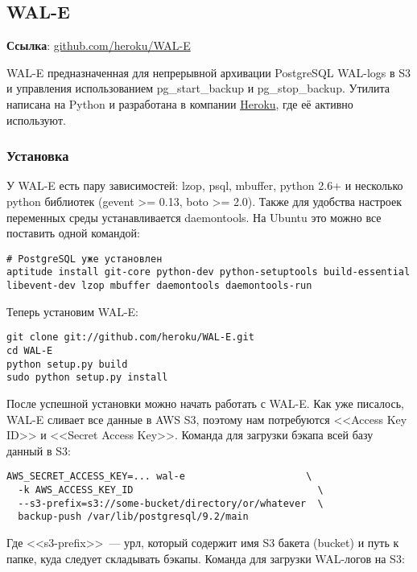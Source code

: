 \subsection{WAL-E}
\textbf{Ссылка}: \href{https://github.com/heroku/WAL-E}{github.com/heroku/WAL-E}

WAL-E предназначенная для непрерывной архивации PostgreSQL WAL-logs в S3 и управления использованием pg\_start\_backup и pg\_stop\_backup. Утилита написана на Python и разработана в компании \href{http://www.heroku.com/}{Heroku}, где её активно используют. 

\subsubsection{Установка}

У WAL-E есть пару зависимостей: lzop, psql, mbuffer, python 2.6+ и несколько python библиотек (gevent >= 0.13, boto >= 2.0). Также для удобства настроек переменных среды устанавливается daemontools. На Ubuntu это можно все поставить одной командой:

\begin{lstlisting}[label=lst:wal-e1,caption=Установка зависимостей для WAL-E]
# PostgreSQL уже установлен
aptitude install git-core python-dev python-setuptools build-essential libevent-dev lzop mbuffer daemontools daemontools-run
\end{lstlisting}

Теперь установим WAL-E:

\begin{lstlisting}[label=lst:wal-e2,caption=Установка WAL-E]
git clone git://github.com/heroku/WAL-E.git
cd WAL-E
python setup.py build
sudo python setup.py install
\end{lstlisting}

После успешной установки можно начать работать с WAL-E. Как уже писалось, WAL-E сливает все данные в AWS S3, поэтому нам потребуются <<Access Key ID>> и <<Secret Access Key>>. Команда для загрузки бэкапа всей базу данный в S3:

\begin{lstlisting}[label=lst:wal-e3,caption=Загрузка бэкапа всей базы данных в S3]
AWS_SECRET_ACCESS_KEY=... wal-e                     \
  -k AWS_ACCESS_KEY_ID                                \
  --s3-prefix=s3://some-bucket/directory/or/whatever  \
  backup-push /var/lib/postgresql/9.2/main
\end{lstlisting}

Где <<s3-prefix>>~--- урл, который содержит имя S3 бакета (bucket) и путь к папке, куда следует складывать бэкапы. Команда для загрузки WAL-логов на S3:

